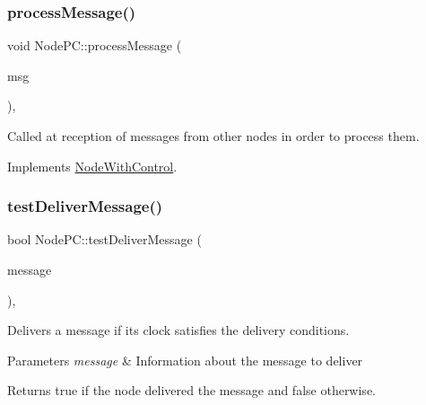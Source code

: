 \mbox{\label{class_node_p_c_aa5fedc4136104a06e2f1131f1ba16b0e}} 
\subsubsection{\texorpdfstring{process\+Message()}{processMessage()}}
{\footnotesize\ttfamily void Node\+P\+C\+::process\+Message (\begin{DoxyParamCaption}\item[{c\+Message $\ast$}]{msg }\end{DoxyParamCaption})\hspace{0.3cm}{\ttfamily [protected]}, {\ttfamily [virtual]}}



Called at reception of messages from other nodes in order to process them. 



Implements \hyperlink{class_node_with_control_af532082fab76c38d8c50ca90e991f4c3}{Node\+With\+Control}.

\mbox{\label{class_node_p_c_a54731196935596e0c6f094a5a8420134}} 
\subsubsection{\texorpdfstring{test\+Deliver\+Message()}{testDeliverMessage()}}
{\footnotesize\ttfamily bool Node\+P\+C\+::test\+Deliver\+Message (\begin{DoxyParamCaption}\item[{const \hyperlink{structures_8h_a7e7bdc1d2fff8a9436f2f352b2711ed6}{message\+Info} \&}]{message }\end{DoxyParamCaption})\hspace{0.3cm}{\ttfamily [protected]}, {\ttfamily [virtual]}}



Delivers a message if its clock satisfies the delivery conditions. 


\begin{DoxyParams}{Parameters}
{\em message} & Information about the message to deliver \\
\hline
\end{DoxyParams}
\begin{DoxyReturn}{Returns}
true if the node delivered the message and false otherwise. 
\end{DoxyReturn}


